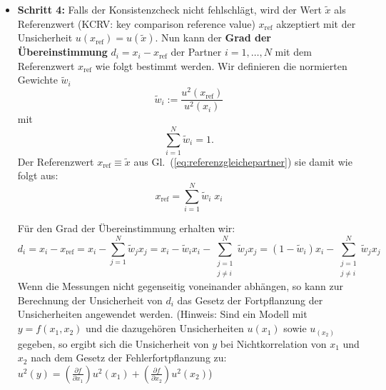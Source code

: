 \begin{itemize}
\item \textbf{Schritt 4:}  \newline
Falls der Konsistenzcheck nicht fehlschlägt, wird der Wert $\tilde x$ als
Referenzwert (KCRV: key comparison reference value) $x_\mathrm{ref}$ akzeptiert
mit der Unsicherheit $u(x_\mathrm{ref}) = u(\tilde x)$. Nun kann der \textbf{Grad 
der Übereinstimmung} $d_i = x_i - x_\mathrm{ref}$ der Partner $i=1,\dots, N$ mit dem Referenzwert $x_\mathrm{ref}$ wie folgt bestimmt werden. 
Wir definieren die normierten Gewichte $\tilde w_i$
\begin{equation}
\tilde w_i := \frac{u^2(x_\mathrm{ref})}{u^2(x_i)}
\label{eq:anteile}
\end{equation}
mit
\begin{equation}
\sum_{i=1}^{N} \tilde w_i = 1 .
\label{eq:normierung}
\end{equation}
Der Referenzwert $x_\mathrm{ref} \equiv \tilde x$ aus Gl.~(\ref{eq:referenzgleichepartner}) sie damit wie folgt aus: 
\begin{equation}
x_\mathrm{ref} = \sum_{i=1}^{N} \tilde w_i\; x_i
\label{eq:referenzgleichepartner2}
\end{equation}

Für den Grad der Übereinstimmung erhalten wir: 
\begin{equation}
d_i = x_i - x_\mathrm{ref} = x_i - \sum_{j=1}^{N} \tilde w_j x_j 
= x_i - \tilde w_i x_i - \sum_{\substack{j=1 \\ j \neq i}}^{N} \tilde w_j x_j 
= (1-\tilde w_i)x_i - \sum_{\substack{j=1 \\ j \neq i}}^{N} \tilde w_j x_j 
\end{equation}
Wenn die Messungen nicht gegenseitig voneinander abhängen, so kann 
zur Berechnung der Unsicherheit von $d_i$ das Gesetz der Fortpflanzung
der Unsicherheiten angewendet werden. (Hinweis: Sind ein Modell mit $y=f(x_1, x_2)$ und 
die dazugehören Unsicherheiten $u(x_1)$ sowie $u_(x_2)$ gegeben, so ergibt sich die Unsicherheit von
$y$ bei Nichtkorrelation von $x_1$ und $x_2$ nach dem Gesetz der Fehlerfortpflanzung zu: 
$u^2(y)=\left(\frac{\partial f}{\partial x_1}\right)u^2(x_1)+\left(\frac{\partial f}{\partial x_2}\right)u^2(x_2)$)


\end{itemize}
